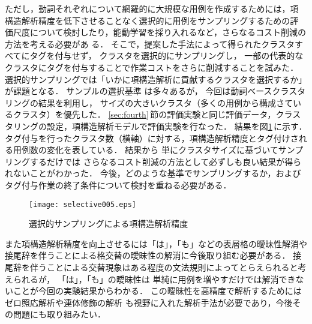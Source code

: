 ただし，動詞それぞれについて網羅的に大規模な用例を作成するためには，項
構造解析精度を低下させることなく選択的に用例をサンプリングするための評
価尺度について検討したり，能動学習を採り入れるなど，さらなるコスト削減の方法を考える必要があ
る．
そこで，提案した手法によって得られたクラスタすべてにタグを付与せず，
クラスタを選択的にサンプリングし，
一部の代表的なクラスタにタグを付与することで作業コストをさらに削減することを試みた．
選択的サンプリングでは「いかに項構造解析に貢献するクラスタを選択するか」が課題となる．
サンプルの選択基準
は多々あるが，
今回は動詞ベースクラスタリングの結果を利用し，
サイズの大きいクラスタ（多くの用例から構成さているクラスタ）を優先した．
\ref{sec:fourth}\,節の評価実験と同じ評価データ，クラスタリングの設定，項構造解析モデルで評価実験を行なった．
結果を図\ref{fig:res3}\,に示す．
タグ付与を行ったクラスタ数（横軸）に対する，項構造解析精度とタグ付けされる用例数の変化を表している．
結果から
単にクラスタサイズに基づいてサンプリングするだけでは
さらなるコスト削減の方法として必ずしも良い結果が得られないことがわかった．
今後，どのような基準でサンプリングするか，およびタグ付与作業の終了条件について検討を重ねる必要がある．


\begin{figure}[t]
\begin{center}
        \texttt{[image: selective005.eps]}
    \caption{選択的サンプリングによる項構造解析精度}
    \label{fig:res3}
\end{center}
\end{figure}


また項構造解析精度を向上させるには「は」，「も」などの表層格の曖昧性解消や
接尾辞を伴うことによる格交替の曖昧性の解消に今後取り組む必要がある．
接尾辞を伴うことによる交替現象はある程度の文法規則によってとらえられると考えられるが，
「は」，「も」の曖昧性は
単純に用例を増やすだけでは解消できないことが今回の実験結果からわかる．
この曖昧性を高精度で解析するためには
ゼロ照応解析や連体修飾の解析
も視野に入れた解析手法が必要であり，今後その問題にも取り組みたい．



